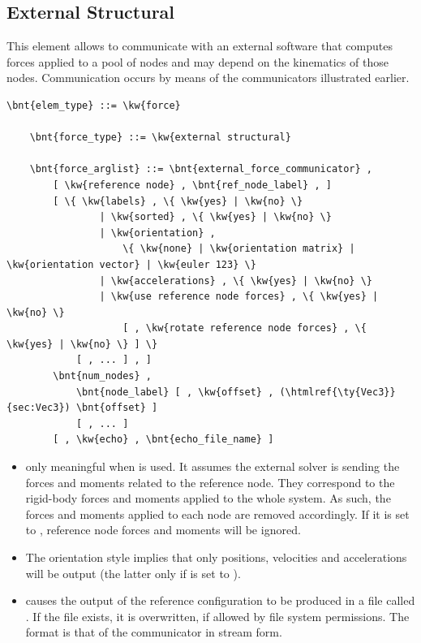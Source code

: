 \subsection{External Structural}
\label{sec:EL:FORCE:EXTERNAL:STRUCTURAL}
This element allows to communicate with an external software that computes
forces applied to a pool of nodes and may depend on the kinematics of those
nodes.
Communication occurs by means of the communicators illustrated earlier.
\begin{Verbatim}[commandchars=\\\{\}]
    \bnt{elem_type} ::= \kw{force}

    \bnt{force_type} ::= \kw{external structural}

    \bnt{force_arglist} ::= \bnt{external_force_communicator} ,
        [ \kw{reference node} , \bnt{ref_node_label} , ]
        [ \{ \kw{labels} , \{ \kw{yes} | \kw{no} \}
                | \kw{sorted} , \{ \kw{yes} | \kw{no} \}
                | \kw{orientation} ,
                    \{ \kw{none} | \kw{orientation matrix} | \kw{orientation vector} | \kw{euler 123} \}
                | \kw{accelerations} , \{ \kw{yes} | \kw{no} \}
                | \kw{use reference node forces} , \{ \kw{yes} | \kw{no} \}
                    [ , \kw{rotate reference node forces} , \{ \kw{yes} | \kw{no} \} ] \}
            [ , ... ] , ]
        \bnt{num_nodes} ,
            \bnt{node_label} [ , \kw{offset} , (\htmlref{\ty{Vec3}}{sec:Vec3}) \bnt{offset} ]
            [ , ... ]
        [ , \kw{echo} , \bnt{echo_file_name} ]
\end{Verbatim}
\begin{itemize}
\item {} only meaningful
when  is used.
It assumes the external solver is sending the forces and moments
related to the reference node.
They correspond to the rigid-body forces and moments applied
to the whole system.
As such, the forces and moments applied to each node
are removed accordingly.
If it is set to , reference node forces and moments
will be ignored.

\item The orientation style  implies that only positions, velocities 
and accelerations will be output (the latter only if 
is set to ).

\item {} causes the output of the reference configuration
to be produced in a file called .
If the file exists, it is overwritten, if allowed by file system permissions.
The format is that of the communicator in stream form.
\end{itemize}



